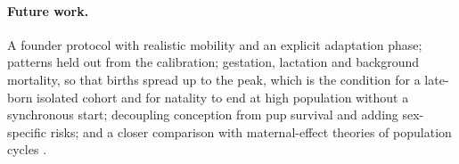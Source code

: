 \paragraph{Future work.}
A founder protocol with realistic mobility and an explicit adaptation phase; patterns held out from the calibration;
gestation, lactation and background mortality, so that births spread up to the peak, which is the condition for a
late-born isolated cohort and for natality to end at high population without a synchronous start; decoupling
conception from pup survival and adding sex-specific risks; and a closer comparison with maternal-effect theories of
population cycles \cite{GinzburgTaneyhill1994,InchaustiGinzburg1998}.

